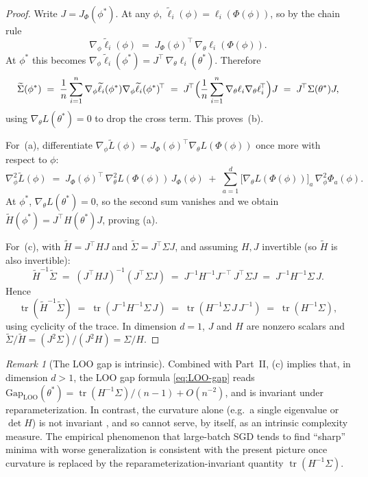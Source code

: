 \documentclass[11pt,a4paper]{article}
\theoremstyle{definition}
\theoremstyle{remark}
\newtheorem{remark}[theorem]{Remark}
\DeclareMathOperator{\tr}{tr}
\newcommand{\Gap}{\mathrm{Gap}}
\newcommand{\LOO}{\mathrm{LOO}}
\begin{document}
\begin{proof}
   Write $J=J_\Phi(\phi^*)$.  At any $\phi$,
   $\widetilde\ell_i(\phi) = \ell_i(\Phi(\phi))$, so by the chain rule
   \[
      \nabla_\phi \widetilde\ell_i(\phi)
      \;=\; J_\Phi(\phi)^{\!\top}\,\nabla_\theta \ell_i(\Phi(\phi)).
   \]
   At $\phi^*$ this becomes
   $\nabla_\phi \widetilde\ell_i(\phi^*)
   = J^{\!\top}\,\nabla_\theta\ell_i(\theta^*)$.
   Therefore
   \[
      \widetilde\Sigma(\phi^*)
      \;=\; \frac{1}{n}\sum_{i=1}^n \nabla_\phi\widetilde\ell_i(\phi^*)
                                   \nabla_\phi\widetilde\ell_i(\phi^*)^{\!\top}
      \;=\; J^{\!\top}\Bigl(\frac{1}{n}\sum_{i=1}^n
                              \nabla_\theta\ell_i\nabla_\theta\ell_i^{\!\top}
                            \Bigr) J
      \;=\; J^{\!\top}\Sigma(\theta^*) J,
   \]
   using $\nabla_\theta L(\theta^*)=0$ to drop the cross term.  This
   proves~(b).

   For~(a), differentiate $\nabla_\phi \widetilde L(\phi)
   = J_\Phi(\phi)^{\!\top}\nabla_\theta L(\Phi(\phi))$ once more with
   respect to $\phi$:
   \[
      \nabla_\phi^2 \widetilde L(\phi)
      \;=\; J_\Phi(\phi)^{\!\top}\,\nabla_\theta^2 L(\Phi(\phi))\,J_\Phi(\phi)
            \;+\; \sum_{a=1}^d
              \bigl[\nabla_\theta L(\Phi(\phi))\bigr]_a\,
              \nabla_\phi^2 \Phi_a(\phi).
   \]
   At $\phi^*$, $\nabla_\theta L(\theta^*) = 0$, so the second sum
   vanishes and we obtain
   $\widetilde H(\phi^*) = J^{\!\top} H(\theta^*) J$, proving (a).

   For~(c), with $\widetilde H = J^{\!\top} H J$ and
   $\widetilde\Sigma = J^{\!\top}\Sigma J$, and assuming $H,J$ invertible
   (so $\widetilde H$ is also invertible):
   \[
      \widetilde H^{-1} \widetilde \Sigma
      \;=\; (J^{\!\top}HJ)^{-1}(J^{\!\top}\Sigma J)
      \;=\; J^{-1} H^{-1} J^{-\!\top}\,J^{\!\top}\Sigma J
      \;=\; J^{-1} H^{-1}\Sigma\, J.
   \]
   Hence
   \[
      \tr(\widetilde H^{-1}\widetilde\Sigma)
      \;=\; \tr(J^{-1} H^{-1}\Sigma\, J)
      \;=\; \tr(H^{-1}\Sigma\, J\, J^{-1})
      \;=\; \tr(H^{-1}\Sigma),
   \]
   using cyclicity of the trace.  In dimension $d=1$, $J$ and $H$ are
   nonzero scalars and $\widetilde\Sigma/\widetilde H
   = (J^2 \Sigma)/(J^2 H) = \Sigma/H$.
\end{proof}

\begin{remark}[The LOO gap is intrinsic]\label{rem:loo-intrinsic}
   Combined with  Part~II,  (c)
   implies that, in dimension $d>1$, the LOO gap formula
   \eqref{eq:LOO-gap} reads
   $\Gap_{\LOO}(\theta^*) = \tr(H^{-1}\Sigma)/(n-1) + O(n^{-2})$, and is
   invariant under reparameterization.  In contrast, the curvature
   alone (e.g.\ a single eigenvalue or $\det H$) is not invariant
   \cite{Dinh2017}, and so cannot serve, by itself, as an intrinsic
   complexity measure.  The empirical phenomenon that large-batch SGD
   tends to find ``sharp'' minima with worse generalization
   \cite{KeskarMudigereSmelyanskiyTangNocedal2017} is consistent with
   the present picture once curvature is replaced by the
   reparameterization-invariant quantity $\tr(H^{-1}\Sigma)$.
\end{remark}
\end{document}
